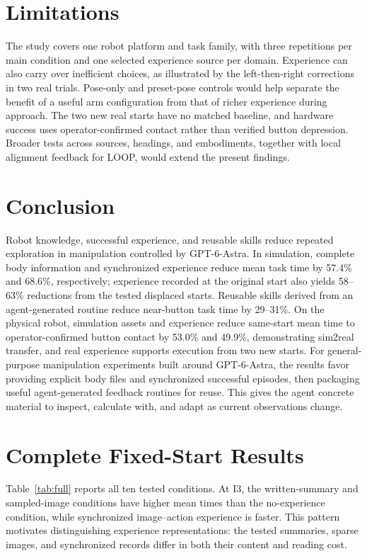 \documentclass[11pt]{article}
\begin{document}
\section{Limitations}\label{sec:limitations}
The study covers one robot platform and task family, with three repetitions per main condition and one selected experience source per domain. Experience can also carry over inefficient choices, as illustrated by the left-then-right corrections in two real trials. Pose-only and preset-pose controls would help separate the benefit of a useful arm configuration from that of richer experience during approach. The two new real starts have no matched baseline, and hardware success uses operator-confirmed contact rather than verified button depression. Broader tests across sources, headings, and embodiments, together with local alignment feedback for LOOP, would extend the present findings.

\section{Conclusion}
Robot knowledge, successful experience, and reusable skills reduce repeated exploration in manipulation controlled by GPT-6-Astra. In simulation, complete body information and synchronized experience reduce mean task time by 57.4\% and 68.6\%, respectively; experience recorded at the original start also yields 58--63\% reductions from the tested displaced starts. Reusable skills derived from an agent-generated routine reduce near-button task time by 29--31\%. On the physical robot, simulation assets and experience reduce same-start mean time to operator-confirmed button contact by 53.0\% and 49.9\%, demonstrating sim2real transfer, and real experience supports execution from two new starts. For general-purpose manipulation experiments built around GPT-6-Astra, the results favor providing explicit body files and synchronized successful episodes, then packaging useful agent-generated feedback routines for reuse. This gives the agent concrete material to inspect, calculate with, and adapt as current observations change.

\begingroup
\small
\setlength{\parskip}{0pt}
\setlength{\bibsep}{4pt}


\endgroup
\clearpage
\appendix
\small
\setlength{\parskip}{6pt plus 1pt minus 1pt}
\section{Complete Fixed-Start Results}\label{app:fixed}
Table~\ref{tab:full} reports all ten tested conditions. At I3, the written-summary and sampled-image conditions have higher mean times than the no-experience condition, while synchronized image--action experience is faster. This pattern motivates distinguishing experience representations: the tested summaries, sparse images, and synchronized records differ in both their content and reading cost.
\begin{table}[H]\centering\small
\caption{Complete fixed-start results. SD is sample standard deviation. Every condition succeeds 3/3; time uses the simulation service task clock.}\label{tab:full}\end{table}
\end{document}
